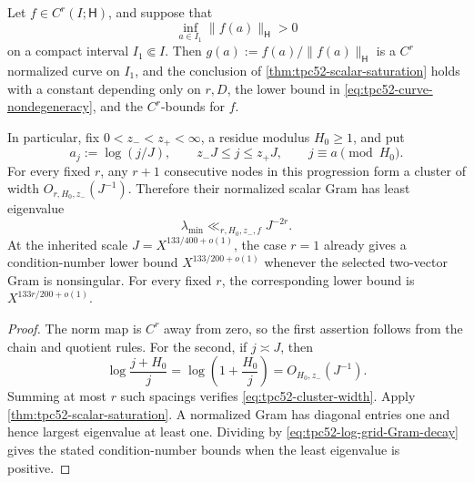\begin{corollary}
\label{cor:tpc52-log-grid-saturation}
Let \(f\in C^r(I;\mathsf H)\), and suppose that
\begin{equation}
 \inf_{a\in I_1}\|f(a)\|_{\mathsf H}>0
 \label{eq:tpc52-curve-nondegeneracy}
\end{equation}
on a compact interval \(I_1\Subset I\).  Then
\(g(a):=f(a)/\|f(a)\|_{\mathsf H}\) is a \(C^r\) normalized curve on
\(I_1\), and the conclusion of
\cref{thm:tpc52-scalar-saturation} holds with a constant depending only
on \(r,D\), the lower bound in
\eqref{eq:tpc52-curve-nondegeneracy}, and the \(C^r\)-bounds for \(f\).

In particular, fix \(0<z_-<z_+<\infty\), a residue modulus
\(H_0\geq1\), and put
\begin{equation}
 a_j:=\log(j/J),
 \qquad z_-J\leq j\leq z_+J,
 \qquad j\equiv a\pmod {H_0}.
 \label{eq:tpc52-log-orbit-nodes}
\end{equation}
For every fixed \(r\), any \(r+1\) consecutive nodes in this
progression form a cluster of width \(O_{r,H_0,z_-}(J^{-1})\).
Therefore their normalized scalar Gram has least eigenvalue
\begin{equation}
 \lambda_{\min}\ll_{r,H_0,z_-,f}J^{-2r}.
 \label{eq:tpc52-log-grid-Gram-decay}
\end{equation}
At the inherited scale \(J=X^{133/400+o(1)}\), the case \(r=1\)
already gives a condition-number lower bound
\(X^{133/200+o(1)}\) whenever the selected two-vector Gram is
nonsingular.  For every fixed \(r\), the corresponding lower bound is
\(X^{133r/200+o(1)}\).
\end{corollary}

\begin{proof}
The norm map is \(C^r\) away from zero, so the first assertion follows
from the chain and quotient rules.  For the second, if
\(j\asymp J\), then
\begin{equation}
 \log\frac{j+H_0}{j}
 =\log\left(1+\frac{H_0}{j}\right)
 =O_{H_0,z_-}(J^{-1}).
 \label{eq:tpc52-adjacent-log-spacing}
\end{equation}
Summing at most \(r\) such spacings verifies
\eqref{eq:tpc52-cluster-width}.  Apply
\cref{thm:tpc52-scalar-saturation}.  A normalized Gram has diagonal
entries one and hence largest eigenvalue at least one.  Dividing by
\eqref{eq:tpc52-log-grid-Gram-decay} gives the stated condition-number
bounds when the least eigenvalue is positive.
\end{proof}

